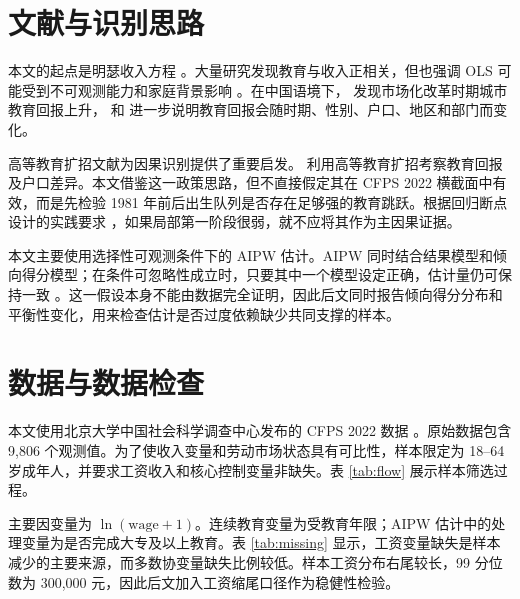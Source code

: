 \documentclass[UTF8,12pt]{ctexart}
\begin{document}
\section{文献与识别思路}

本文的起点是明瑟收入方程 \citep{mincer1974schooling}。大量研究发现教育与收入正相关，但也强调 OLS 可能受到不可观测能力和家庭背景影响 \citep{card1999causal}。在中国语境下，\citet{zhang2005urban} 发现市场化改革时期城市教育回报上升，\citet{asadullah2020changing} 和 \citet{ma2021meta} 进一步说明教育回报会随时期、性别、户口、地区和部门而变化。

高等教育扩招文献为因果识别提供了重要启发。\citet{huang2022expansion} 利用高等教育扩招考察教育回报及户口差异。本文借鉴这一政策思路，但不直接假定其在 CFPS 2022 横截面中有效，而是先检验 1981 年前后出生队列是否存在足够强的教育跳跃。根据回归断点设计的实践要求 \citep{imbens2008rd, lee2010rd}，如果局部第一阶段很弱，就不应将其作为主因果证据。

本文主要使用选择性可观测条件下的 AIPW 估计。AIPW 同时结合结果模型和倾向得分模型；在条件可忽略性成立时，只要其中一个模型设定正确，估计量仍可保持一致 \citep{bang2005doubly}。这一假设本身不能由数据完全证明，因此后文同时报告倾向得分分布和平衡性变化，用来检查估计是否过度依赖缺少共同支撑的样本。

\section{数据与数据检查}

本文使用北京大学中国社会科学调查中心发布的 CFPS 2022 数据 \citep{xie2015sampling, cfps2022data}。原始数据包含 9,806 个观测值。为了使收入变量和劳动市场状态具有可比性，样本限定为 18--64 岁成年人，并要求工资收入和核心控制变量非缺失。表 \ref{tab:flow} 展示样本筛选过程。

\begin{table}[H]
\centering
\caption{样本构造过程}
\label{tab:flow}

\end{table}

主要因变量为 $\ln(\mathrm{wage}+1)$。连续教育变量为受教育年限；AIPW 估计中的处理变量为是否完成大专及以上教育。表 \ref{tab:missing} 显示，工资变量缺失是样本减少的主要来源，而多数协变量缺失比例较低。样本工资分布右尾较长，99 分位数为 300,000 元，因此后文加入工资缩尾口径作为稳健性检验。

\begin{table}[H]
\centering
\caption{原始数据缺失情况检查}
\label{tab:missing}

\end{table}
\end{document}
